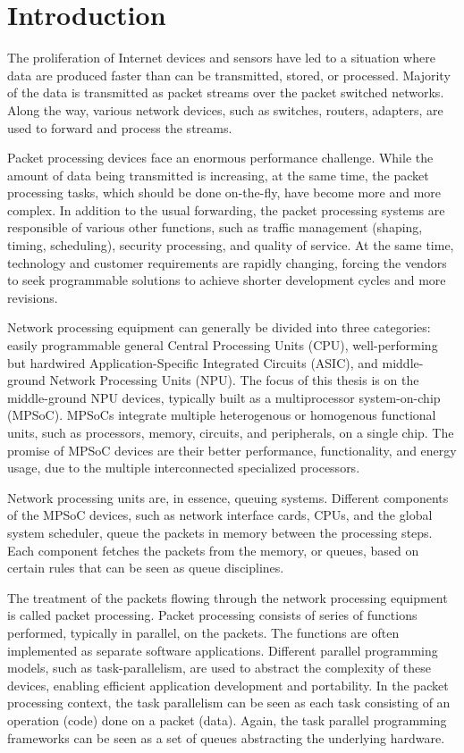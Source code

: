 \chapter{Introduction}
\label{chapter:intro}
The proliferation of Internet devices and sensors have led to a situation where data are produced faster than can be transmitted, stored, or processed. Majority of the data is transmitted as packet streams over the packet switched networks. Along the way, various network devices, such as switches, routers, adapters, are used to forward and process the streams.

Packet processing devices face an enormous performance challenge. While the amount of data being transmitted is increasing, at the same time, the packet processing tasks, which should be done on-the-fly, have become more and more complex. In addition to the usual forwarding, the packet processing systems are responsible of various other functions, such as traffic management (shaping, timing, scheduling), security processing, and quality of service. At the same time, technology and customer requirements are rapidly changing, forcing the vendors to seek programmable solutions to achieve shorter development cycles and more revisions.

Network processing equipment can generally be divided into three categories: easily programmable general Central Processing Units (CPU), well-performing but hardwired Application-Specific Integrated Circuits (ASIC), and middle-ground Network Processing Units (NPU). The focus of this thesis is on the middle-ground NPU devices, typically built as a multiprocessor system-on-chip (MPSoC). MPSoCs integrate multiple heterogenous or homogenous functional units, such as processors, memory, circuits, and peripherals, on a single chip. The promise of MPSoC devices are their better performance,  functionality, and energy usage, due to the multiple interconnected specialized processors.

Network processing units are, in essence, queuing systems. Different components of the MPSoC devices, such as network interface cards, CPUs, and the global system scheduler, queue the packets in memory between the processing steps. Each component fetches the packets from the memory, or queues, based on certain rules that can be seen as queue disciplines.

The treatment of the packets flowing through the network processing equipment is called packet processing. Packet processing consists of series of functions performed, typically in parallel, on the packets. The functions are often implemented as separate software applications. Different parallel programming models, such as task-parallelism, are used to abstract the complexity of these devices, enabling efficient application development and portability. In the packet processing context, the task parallelism can be seen as each task consisting of an operation (code) done on a packet (data). Again, the task parallel programming frameworks can be seen as a set of queues abstracting the underlying hardware.

